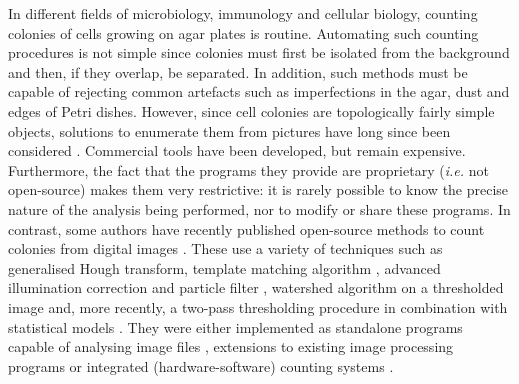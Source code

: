 \documentclass[10pt]{article}
\begin{document}
In different fields of microbiology, immunology and cellular biology, counting
colonies of cells growing on agar plates is routine.
Automating such counting procedures is not simple since colonies must first be isolated
from the background and then, if they overlap, be separated. In addition, such methods must be capable of rejecting common artefacts
such as imperfections in the agar, dust and edges of Petri dishes.
However, since cell colonies are topologically fairly simple objects, solutions to
enumerate them from pictures have long since been considered
\cite{mansberg_automatic_1957,mukherjee_bacterial_1995}. Commercial tools have
been developed\cite{putman_simplified_2005}, but remain expensive.
Furthermore, the fact that the programs they provide are proprietary 
(\emph{i.e.} not open-source) makes them very restrictive: it is rarely possible
to know the precise nature of the analysis being performed, nor to modify or
share these programs.
In contrast, some authors have recently published open-source methods to count
colonies from digital images
\cite{cai_optimized_2011,bewes_automated_2008,niyazi_counting_2007,clarke_lowcost_2010,sieuwerts_simple_2008,vokes_using_2008,brugger_automated_2012}. 
These use a variety of techniques such as generalised Hough transform\cite{bewes_automated_2008}, 
template matching algorithm \cite{kachouie_arraycount_2009},
advanced illumination correction and particle filter \cite {vokes_using_2008},
watershed algorithm on a thresholded image \cite{sieuwerts_simple_2008,cai_optimized_2011} and,
more recently, a two-pass thresholding procedure in combination with statistical models \cite{brugger_automated_2012}.
They were either implemented as
standalone programs capable of analysing image files \cite{niyazi_counting_2007,bewes_automated_2008,kachouie_arraycount_2009,clarke_lowcost_2010},
extensions to existing image processing programs \cite{vokes_using_2008,sieuwerts_simple_2008,cai_optimized_2011} or
integrated (hardware-software) counting systems \cite{brugger_automated_2012}.
\end{document}
